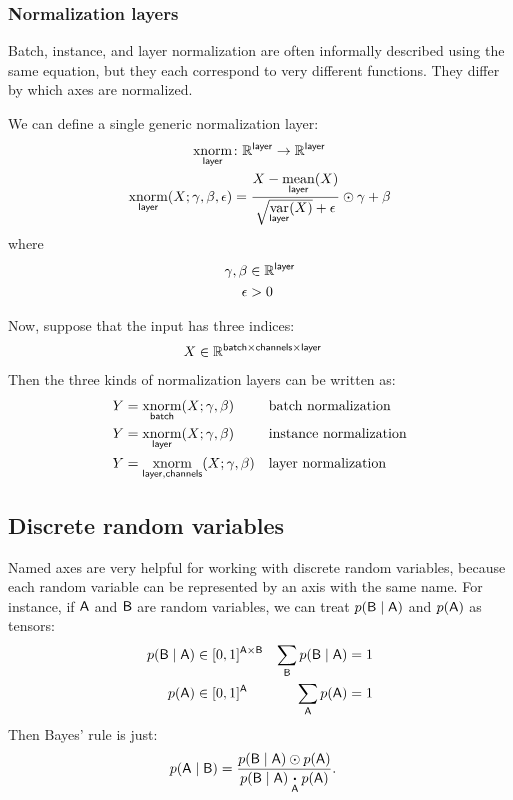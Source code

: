 \documentclass{article}
\newcommand{\reals}{\mathbb{R}}
\begin{document}
\subsubsection{Normalization layers}

Batch, instance, and layer normalization are often informally described using the same
equation, but they each correspond to very different functions. They differ
by which axes are normalized.

We can define a single generic normalization layer:
\begin{align*}
  \nfun{layer}{xnorm} &\colon \mathbb{R}^{\name{layer}} \rightarrow \mathbb{R}^{\name{layer}} \\
  \nfun{layer}{xnorm}(X; \gamma, \beta, \epsilon) &= \frac{X - \nfun{layer}{mean}(X)}{\sqrt{\nfun{layer}{var}(X)} + \epsilon} \odot \gamma + \beta
\end{align*}
where
\begin{align*}
  \gamma, \beta &\in \mathbb{R}^{\name{layer}} \\
  \epsilon &> 0
\end{align*}

Now, suppose that the input has three indices:
\begin{align*}
X &\in \reals^{{\name{batch} \times \name{channels} \times \name{layer}}}
\end{align*}
Then the three kinds of normalization layers can be written as:
\begin{align*}
Y &= \nfun{batch}{xnorm}(X; \gamma, \beta) && \text{batch normalization} \\
Y &= \nfun{layer}{xnorm}(X; \gamma, \beta) && \text{instance normalization} \\
Y &= \nfun{layer,channels}{xnorm}(X; \gamma, \beta) && \text{layer normalization}
\end{align*}

\subsection{Discrete random variables}

Named axes are very helpful for working with discrete random variables, because each random variable can be represented by an axis with the same name. For instance, if $\name{A}$ and $\name{B}$ are random variables, we can treat $p(\name{B} \mid \name{A})$ and $p(\name{A})$ as tensors:
\begin{align*}
p(\name{B} \mid \name{A}) &\in [0, 1]^{\name{A} \times \name{B}} & \nsum{B} p(\name{B}\mid \name{A}) &= 1 \\
p(\name{A}) &\in [0, 1]^{\name{A}} & \nsum{A} p(\name{A}) &= 1
\end{align*}
Then Bayes' rule is just:
\begin{align*}
p(\name{A} \mid \name{B}) &= \frac{p(\name{B} \mid \name{A}) \odot p(\name{A})}{p(\name{B} \mid \name{A}) \ndot{A} p(\name{A})}.
\end{align*}
\end{document}
